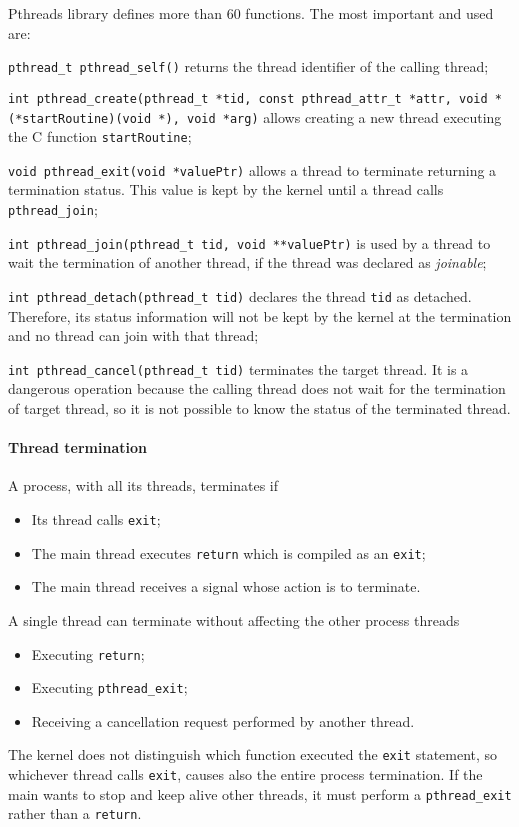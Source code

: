 Pthreads library defines more than 60 functions. The most important and used are:
\begin{description}
\item \texttt{pthread\_t pthread\_self()} returns the thread identifier of the calling thread;
\item \texttt{int pthread\_create(pthread\_t *tid, const pthread\_attr\_t *attr, \newline void *(*startRoutine)(void *), void *arg)} allows creating a new thread executing the C function \texttt{startRoutine};
\item \texttt{void pthread\_exit(void *valuePtr)} allows a thread to terminate returning a termination status. This value is kept by the kernel until a thread calls \texttt{pthread\_join};
\item \texttt{int pthread\_join(pthread\_t tid, void **valuePtr)} is used by a thread to wait the termination of another thread, if the thread was declared as \emph{joinable};
\item \texttt{int pthread\_detach(pthread\_t tid)} declares the thread \texttt{tid} as detached. Therefore, its status information will not be kept by the kernel at the termination and no thread can join with that thread;
\item \texttt{int pthread\_cancel(pthread\_t tid)} terminates the target thread. It is a dangerous operation because the calling thread does not wait for the termination of target thread, so it is not possible to know the status of the terminated thread.
\end{description}

\paragraph{Thread termination}
A process, with all its threads, terminates if
\begin{itemize}
\item Its thread calls \texttt{exit};
\item The main thread executes \texttt{return} which is compiled as an \texttt{exit};
\item The main thread receives a signal whose action is to terminate.
\end{itemize}
A single thread can terminate without affecting the other process threads
\begin{itemize}
\item Executing \texttt{return};
\item Executing \texttt{pthread\_exit};
\item Receiving a cancellation request performed by another thread.
\end{itemize}

The kernel does not distinguish which function executed the \texttt{exit} statement, so whichever thread calls \texttt{exit}, causes also the entire process termination. If the main wants to stop and keep alive other threads, it must perform a \texttt{pthread\_exit} rather than a \texttt{return}.